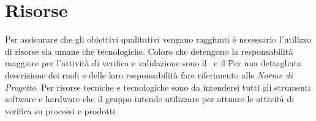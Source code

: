 \section{Risorse}

Per assicurare che gli obiettivi qualitativi vengano raggiunti è necessario l'utilizzo di risorse sia umane che tecnologiche. Coloro che detengono la responsabilità maggiore per l'attività di verifica e validazione sono il \ruoloResponsabile\ e il \ruoloVerificatore\. Per una dettagliata descrizione dei ruoli e delle loro responsabilità fare riferimento alle \textit{Norme di Progetto}. Per risorse tecniche e tecnologiche sono da intendersi tutti gli strumenti software e hardware che il gruppo intende utilizzare per attuare le attività di verifica su processi e prodotti.